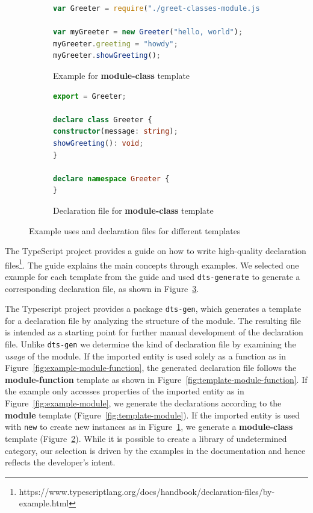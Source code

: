 \documentclass[sigplan,screen]{acmart}
\newcommand{\figref}[1]{Figure~\ref{#1}}
\begin{document}
\begin{figure}[t]
  \begin{subfigure}[t]{0.48\linewidth}
    \begin{lstlisting}[language=JavaScript,numbers=none]
var Greeter = require("./greet-classes-module.js");

var myGreeter = new Greeter("hello, world");
myGreeter.greeting = "howdy";
myGreeter.showGreeting();
    \end{lstlisting}
    \caption{Example for \textbf{module-class} template}
    \label{fig:example-class}
  \end{subfigure}
  \hfill
  \begin{subfigure}[t]{0.48\linewidth}
    \begin{lstlisting}[language=TypeScript,numbers=none]
export = Greeter;

declare class Greeter {
constructor(message: string);
showGreeting(): void;
}

declare namespace Greeter {
}
    \end{lstlisting}
    \caption{Declaration file for \textbf{module-class} template}
    \label{fig:template-class}
  \end{subfigure}

\caption{Example uses and declaration files for different templates}
\label{fig:typescript-templates-by-example}
\end{figure}

The TypeScript project provides a guide on how to write high-quality declaration
files\footnote{https://www.typescriptlang.org/docs/handbook/declaration-files/by-example.html}. The guide
explains the main concepts through examples. We selected one example for each template
from the guide and
used \texttt{dts-generate} to generate a corresponding declaration file, as shown in
\figref{fig:typescript-templates-by-example}.

The Typescript project provides a package \texttt{dts-gen}, which
generates a template for a declaration file by analyzing the structure
of the module. The resulting file is intended as a starting point for further
manual development of the declaration file. 
Unlike \texttt{dts-gen} we determine the kind of declaration file by
examining the \emph{usage} of the module. If the imported entity is
used solely as a function as in
Figure~\ref{fig:example-module-function}, the 
generated declaration file follows the \textbf{module-function}
template as shown in Figure~\ref{fig:template-module-function}. 
If the example only accesses properties of the imported entity as in
Figure~\ref{fig:example-module}, we generate the declarations
according to the \textbf{module} template
(Figure~\ref{fig:template-module}). 
If the imported entity is used with \lstinline/new/ to create new instances as in
Figure~\ref{fig:example-class}, we generate a \textbf{module-class} template (Figure~\ref{fig:template-class}).
While it is possible to create a library of undetermined category, our selection is driven
by the examples in the documentation and 
hence reflects the developer's intent.
\end{document}
